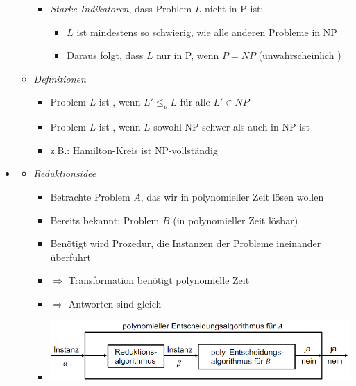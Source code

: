 \documentclass[
    12pt,
    a4paper,
    ngerman,
    color=3b,%
    marginpar=false,
    colorback=false,
    leqno,
]{tudaexercise}
\begin{document}
\begin{itemize}
\begin{itemize}
\begin{itemize}
                        \item \textit{Starke Indikatoren}, dass Problem $L$ nicht in P ist:
                              \begin{itemize}
                                  \item $L$ ist mindestens so schwierig, wie alle anderen Probleme in NP
                                  \item Daraus folgt, dass $L$ nur in P, wenn $P=NP$ (unwahrscheinlich )
                              \end{itemize}
                    \end{itemize}
              \item \textit{Definitionen}
                    \begin{itemize}
                        \item Problem $L$ ist , wenn $L' \leq_p L$ für alle $L' \in NP$
                        \item Problem $L$ ist , wenn $L$ sowohl NP-schwer als auch in NP ist
                        \item z.B.: Hamilton-Kreis ist NP-vollständig
                    \end{itemize}
          \end{itemize}

          \pagebreak

    \item {}
          \begin{itemize}
              \item \textit{Reduktionsidee}
                    \begin{itemize}
                        \item Betrachte Problem $A$, das wir in polynomieller Zeit lösen wollen
                        \item Bereits bekannt: Problem $B$ (in polynomieller Zeit lösbar)
                        \item Benötigt wird Prozedur, die Instanzen der Probleme ineinander überführt
                        \item[] $\Rightarrow$ Transformation benötigt polynomielle Zeit
                        \item[] $\Rightarrow$ Antworten sind gleich
                        \item[] \includegraphics[width=12cm]{pictures/reduktion1.PNG}
                    \end{itemize}


\end{itemize}
\end{itemize}
\end{document}
